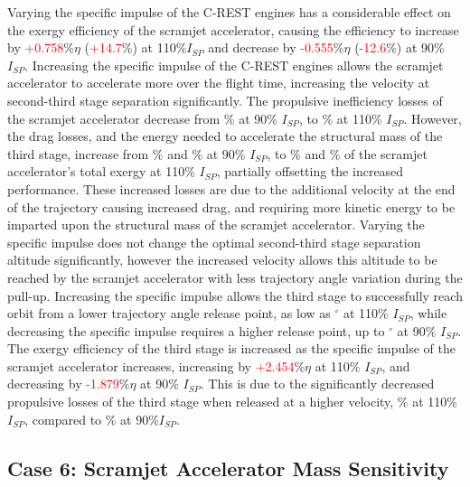 Varying the specific impulse of the C-REST engines has a considerable effect on the exergy efficiency of the scramjet accelerator, causing the efficiency to increase by \textcolor{red}{+0.758}\%$\eta$ (\textcolor{red}{+14.7}\%) at 110\%$I_{SP}$ and decrease by \textcolor{red}{-0.555}\%$\eta$ (\textcolor{red}{-12.6}\%) at 90\% $I_{SP}$. 
Increasing the specific impulse of the C-REST engines allows the scramjet accelerator to accelerate more over the flight time, increasing the velocity at second-third stage separation significantly. The propulsive inefficiency losses of the scramjet accelerator decrease from \PlosssecondIspNinetyNoReturn\% at 90\% $I_{SP}$, to \PlosssecondIspOneHundredTenNoReturn \% at 110\% $I_{SP}$. However, the drag losses, and the energy needed to accelerate the structural mass of the third stage, increase from \WDsecondIspNinetyNoReturn\% and \WsecondIspNinetyNoReturn\% at 90\% $I_{SP}$, to \WDsecondIspOneHundredTenNoReturn\% and \WsecondIspOneHundredTenNoReturn\% of the scramjet accelerator's total exergy at 110\% $I_{SP}$, partially offsetting the increased performance. These increased losses are due to the additional velocity at the end of the trajectory causing increased drag, and requiring more kinetic energy to be imparted upon the structural mass of the scramjet accelerator. 
 Varying the specific impulse does not change the optimal second-third stage separation altitude significantly, however the increased velocity allows this altitude to be reached by the scramjet accelerator with less trajectory angle variation during the pull-up. Increasing the specific impulse allows the third stage to successfully reach orbit from a lower trajectory angle release point, as low as \secondthirdSeparationgammaIspOneHundredTenNoReturn$^\circ$ at 110\% $I_{SP}$, while decreasing the specific impulse requires a higher release point, up to \secondthirdSeparationgammaIspNinetyNoReturn$^\circ$ at 90\% $I_{SP}$.
The exergy efficiency of the third stage is increased as the specific impulse of the scramjet accelerator increases, increasing by \textcolor{red}{+2.454}\%$\eta$ at 110\% $I_{SP}$, and decreasing by \textcolor{red}{-1.879}\%$\eta$ at 90\% $I_{SP}$. This is due to the significantly decreased propulsive losses of the third stage when released at a higher velocity, \PlossthreeIspOneHundredTenNoReturn\% at 110\%$I_{SP}$, compared to \PlossthreeIspNinetyNoReturn\% at 90\%$I_{SP}$. 

\subsection{Case 6: Scramjet Accelerator Mass Sensitivity}\label{sec:SpartanMassnoreturn}

